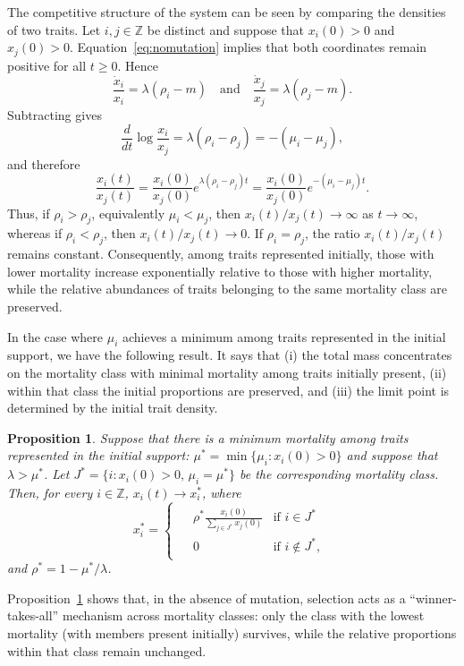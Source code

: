 \documentclass[12pt]{article}
\newtheorem{proposition}{Proposition}
\newcommand{\ds}{\displaystyle}
\newcommand{\Z}{\ensuremath{\mathbb Z}}
\begin{document}
The competitive structure of the system can be seen by comparing the
densities of two traits. Let $i,j\in\Z$ be distinct and suppose that
$x_i(0)>0$ and $x_j(0)>0$. Equation~\eqref{eq:nomutation} implies that
both coordinates remain positive for all $t\geq0$. Hence
$$
\frac{\dot x_i}{x_i}=\lambda(\rho_i-m)
\quad\text{and}\quad
\frac{\dot x_j}{x_j}=\lambda(\rho_j-m).
$$
Subtracting gives
$$
\frac{d}{dt}\log\frac{x_i}{x_j}
=\lambda(\rho_i-\rho_j)
=-(\mu_i-\mu_j),
$$
and therefore
\begin{equation}
\frac{x_i(t)}{x_j(t)}
=
\frac{x_i(0)}{x_j(0)}
e^{\lambda(\rho_i-\rho_j)t}
=
\frac{x_i(0)}{x_j(0)}
e^{-(\mu_i-\mu_j)t}.
\label{ratio}
\end{equation}
Thus, if $\rho_i>\rho_j$, equivalently $\mu_i<\mu_j$, then
$x_i(t)/x_j(t)\to\infty$ as $t\to\infty$, whereas if
$\rho_i<\rho_j$, then $x_i(t)/x_j(t)\to 0$. If
$\rho_i=\rho_j$, the ratio $x_i(t)/x_j(t)$ remains constant.
Consequently, among traits represented initially, those with lower
mortality increase exponentially relative to those with higher
mortality, while the relative abundances of traits belonging to the
same mortality class are preserved.

In the case where $\mu_i$ achieves a minimum 
among traits represented in the initial support, we have the following
result. It says that (i) the total mass concentrates on the mortality class with
minimal mortality among traits initially present, (ii) within that class
the initial proportions are preserved, and (iii) the limit point
is determined by the initial trait density.

\begin{proposition}
\label{minmortality}
Suppose that there is a minimum mortality 
among traits represented in the initial support:
$\mu^*=\min\{\mu_i: x_i(0)>0\}$ and suppose that $\lambda>\mu^*$.
Let $J^*=\{i: x_i(0)>0,\, \mu_i=\mu^*\}$ be the corresponding mortality
class. Then, for every $i\in \Z$, $x_i(t) \to x_i^*$, where
$$
x_i^*= 
\begin{cases}
\begin{aligned}
&{\ds \rho^* \frac{x_i(0)}{\sum_{j\in J^*} x_j(0)}}
           &\text{if } i\in J^*\\[1ex]
&{\ds 0}   &\text{if } i\notin J^*,
\end{aligned}
\end{cases}
$$
and $\rho^*=1-\mu^*/\lambda$.
\end{proposition}


Proposition~\ref{minmortality} shows that, in the absence of mutation,
selection acts as a ``winner-takes-all'' mechanism across mortality
classes: only the class with the lowest mortality (with members present
initially) survives, while the relative proportions within that class
remain unchanged.
\end{document}
